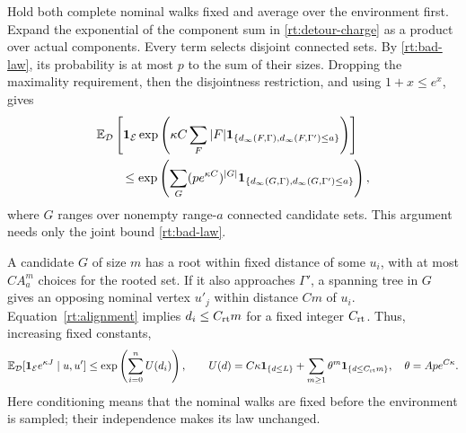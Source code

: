 Hold both complete nominal walks fixed and average over the environment
first.  Expand the exponential of the component sum in
\eqref{rt:detour-charge} as a product over actual components.  Every
term selects disjoint connected sets.  By \eqref{rt:bad-law}, its
probability is at most \(p\) to the sum of their sizes.  Dropping the
maximality requirement, then the disjointness restriction, and using
\(1+x\le e^x\), gives
\begin{align}\label{rt:environment-expansion}
 &\mathbb E_{\mathcal D}
 \left[\mathbf1_{\mathcal E}
  \exp\left(\kappa C\sum_F|F|
     \mathbf1_{\{d_\infty(F,\Gamma),d_\infty(F,\Gamma')\le a\}}
      \right)\right]\\
 &\hspace{2em}\le
 \exp\left(\sum_G(pe^{\kappa C})^{|G|}
     \mathbf1_{\{d_\infty(G,\Gamma),d_\infty(G,\Gamma')\le a\}}
      \right),\notag
\end{align}
where \(G\) ranges over nonempty range-\(a\) connected candidate
sets.  This argument needs only the joint bound \eqref{rt:bad-law}.

A candidate \(G\) of size \(m\) has a root within fixed distance
of some \(u_i\), with at most \(CA_a^m\) choices for the rooted
set.  If it also approaches \(\Gamma'\), a spanning tree in \(G\)
gives an opposing nominal vertex \(u'_j\) within distance \(Cm\)
of \(u_i\).  Equation~\eqref{rt:alignment} implies \(d_i\le C_{\rm rt}m\)
for a fixed integer \(C_{\rm rt}\).  Thus, increasing fixed constants,
\begin{equation}\label{rt:potential}
 \mathbb E_{\mathcal D}
  [\mathbf1_{\mathcal E}e^{\kappa J}\mid u,u']
 \le \exp\left(\sum_{i=0}^nU(d_i)\right),\qquad
 U(d)=C\kappa\mathbf1_{\{d\le L\}}
           +\sum_{m\ge1}\theta^m\mathbf1_{\{d\le C_{\rm rt}m\}},
 \quad \theta=Ap e^{C\kappa}.
\end{equation}
Here conditioning means that the nominal walks are fixed before the
environment is sampled; their independence makes its law unchanged.

